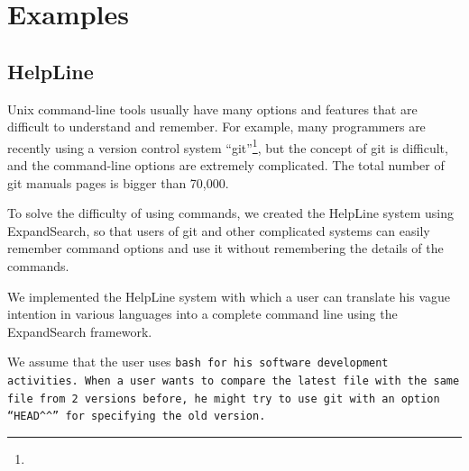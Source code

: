 \documentclass[manuscript,anonymous,review]{acmart}
\def\HL{\textsf{HelpLine}}
\def\GIT{\texttt{git}}
\def\ES{\textsf{ExpandSearch}}
\begin{document}
\section{Examples}

% 

\subsection{HelpLine}

Unix command-line tools usually have many options and features that are difficult to
understand and remember.
For example, many programmers are recently using a version control system
``git''\footnote{
},
but the concept of git is difficult, and the command-line options are extremely complicated.
The total number of git manuals pages is bigger than 70,000.

To solve the difficulty of using commands,
we created the {\HL} system using {\ES}, so that users of git and other complicated systems can
easily remember command options and use it without remembering the details of the commands.

We implemented the {\HL} system
with which a user can translate his vague intention in various languages
into a complete command line using the {\ES} framework.


We assume that the user uses \tt{bash} for his software development activities.
% 
When a user wants to compare the latest  file
with the same file from 2 versions before,
he might try to use {\GIT} with an option
``{\smallfont\verb|HEAD^^|}''
for specifying the old version.
\end{document}
